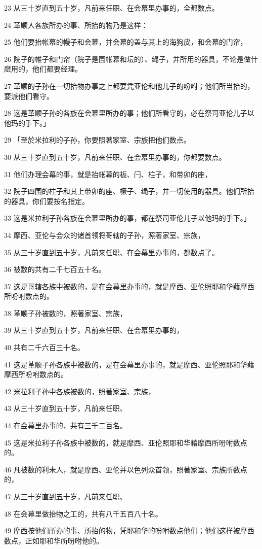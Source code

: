 \par 23 从三十岁直到五十岁，凡前来任职、在会幕里办事的，全都数点。
\par 24 革顺人各族所办的事、所抬的物乃是这样：
\par 25 他们要抬帐幕的幔子和会幕，并会幕的盖与其上的海狗皮，和会幕的门帘，
\par 26 院子的帷子和门帘（院子是围帐幕和坛的）、绳子，并所用的器具，不论是做什麽用的，他们都要经理。
\par 27 革顺的子孙在一切抬物办事之上都要凭亚伦和他儿子的吩咐；他们所当抬的，要派他们看守。
\par 28 这是革顺子孙的各族在会幕里所办的事；他们所看守的，必在祭司亚伦儿子以他玛的手下。」
\par 29 「至於米拉利的子孙，你要照著家室、宗族把他们数点。
\par 30 从三十岁直到五十岁，凡前来任职、在会幕里办事的，你都要数点。
\par 31 他们办理会幕的事，就是抬帐幕的板、闩、柱子，和带卯的座，
\par 32 院子四围的柱子和其上带卯的座、橛子、绳子，并一切使用的器具。他们所抬的器具，你们要按名指定。
\par 33 这是米拉利子孙各族在会幕里所办的事，都在祭司亚伦儿子以他玛的手下。」
\par 34 摩西、亚伦与会众的诸首领将哥辖的子孙，照著家室、宗族，
\par 35 从三十岁直到五十岁，凡前来任职、在会幕里办事的，都数点了。
\par 36 被数的共有二千七百五十名。
\par 37 这是哥辖各族中被数的，是在会幕里办事的，就是摩西、亚伦照耶和华藉摩西所吩咐数点的。
\par 38 革顺子孙被数的，照著家室、宗族，
\par 39 从三十岁直到五十岁，凡前来任职、在会幕里办事的，
\par 40 共有二千六百三十名。
\par 41 这是革顺子孙各族中被数的，是在会幕里办事的，就是摩西、亚伦照耶和华藉摩西所吩咐数点的。
\par 42 米拉利子孙中各族被数的，照著家室、宗族，
\par 43 从三十岁直到五十岁，凡前来任职、
\par 44 在会幕里办事的，共有三千二百名。
\par 45 这是米拉利子孙各族中被数的，就是摩西、亚伦照耶和华藉摩西所吩咐数点的。
\par 46 凡被数的利未人，就是摩西、亚伦并以色列众首领，照著家室、宗族所数点的，
\par 47 从三十岁直到五十岁，凡前来任职、
\par 48 在会幕里做抬物之工的，共有八千五百八十名。
\par 49 摩西按他们所办的事、所抬的物，凭耶和华的吩咐数点他们；他们这样被摩西数点，正如耶和华所吩咐他的。

